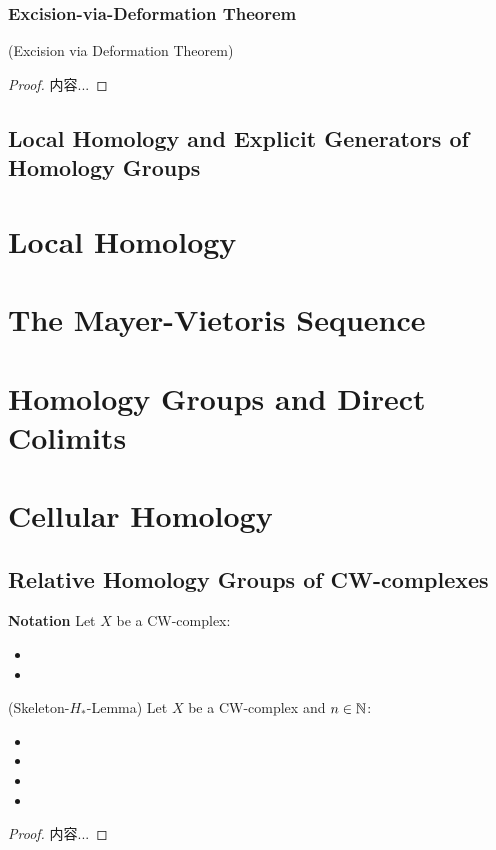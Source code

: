 \documentclass[Total.tex]{subfiles}
\begin{document}
				\subsubsection{Excision-via-Deformation Theorem}
				\begin{theorem}
					(Excision via Deformation Theorem) 
				\end{theorem}
				\begin{proof}
					内容...
				\end{proof}
			\subsection{Local Homology and Explicit Generators of Homology Groups}
		\section{Local Homology}
		\section{The Mayer-Vietoris Sequence}
		\section{Homology Groups and Direct Colimits}
		\section{Cellular Homology}
			\subsection{Relative Homology Groups of CW-complexes}
				\textbf{Notation} Let $X$ be a CW-complex:
				\begin{itemize}
					\item 
					\item 
				\end{itemize}
				
				\begin{lemma}
					(Skeleton-$H_*$-Lemma) Let $X$ be a CW-complex and $n\in \mathbb{N}$:
					\begin{itemize}
						\item 
						\item 
						\item 
						\item 
					\end{itemize}
				\end{lemma}
				\begin{proof}
					内容...
				\end{proof}
\end{document}
